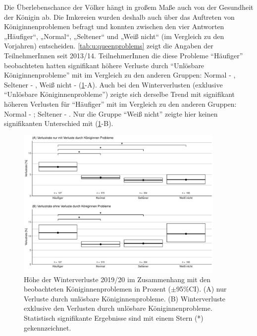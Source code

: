 Die Überlebenschance der Völker hängt in großem Maße auch von der Gesundheit der Königin ab. Die Imkereien wurden deshalb auch über das Auftreten von Königinnenproblemen befragt und konnten zwischen den vier Antworten „Häufiger``, „Normal``, „Seltener`` und „Weiß nicht`` (im Vergleich zu den Vorjahren) entscheiden. \cref{tab:u:queenproblems} zeigt die Angaben der TeilnehmerInnen seit 2013/14.
\newline
TeilnehmerInnen die diese Probleme \enquote{Häufiger} beobachteten hatten signifikant höhere Verluste durch \enquote{Unlösbare Königinnenprobleme} mit  im Vergleich zu den anderen Gruppen: Normal - , Seltener - , Weiß nicht -  (\cref{fig:u:queen:problems}-A). Auch bei den Winterverlusten (exklusive \enquote{Unlösbare Königinnenprobleme}) zeigte sich derselbe Trend mit signifikant höheren Verlusten für \enquote{Häufiger} mit  im Vergleich zu den anderen Gruppen: Normal - ; Seltener - . Nur die Gruppe \enquote{Weiß nicht} zeigte hier keinen signifikanten Unterschied mit  (\cref{fig:u:queen:problems}-B).



\begin{figure}[H]
  \centering
  \includegraphics[keepaspectratio,width=0.9\textwidth]{project-U-wintersterblichkeit/figures/plot_queen_subjectiveproblems}
  \caption{Höhe der Winterverluste 2019/20 im Zusammenhang mit den beobachteten Königinnenproblemen in Prozent ($\pm$95\%CI). (A) nur Verluste durch unlösbare Königinnenprobleme. (B) Winterverluste exklusive den Verlusten durch unlösbare Königinnenprobleme. Statistisch signifikante Ergebnisse sind mit einem Stern (*) gekennzeichnet.}
  \label{fig:u:queen:problems}
\end{figure}


